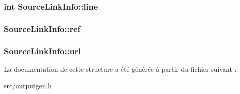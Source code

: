 \subsubsection[{line}]{\setlength{\rightskip}{0pt plus 5cm}int Source\+Link\+Info\+::line}\label{struct_source_link_info_abff71a239d4a657ea1543c0426b5726c}
\hypertarget{struct_source_link_info_a53631fa171fa05192c059087d66278c0}{}
\subsubsection[{ref}]{ Source\+Link\+Info\+::ref}\label{struct_source_link_info_a53631fa171fa05192c059087d66278c0}
\hypertarget{struct_source_link_info_af1fd0f6d7c9418bf922d33d591d7f196}{}
\subsubsection[{url}]{ Source\+Link\+Info\+::url}\label{struct_source_link_info_af1fd0f6d7c9418bf922d33d591d7f196}


La documentation de cette structure a été générée à partir du fichier suivant \+:\begin{DoxyCompactItemize}
\item 
src/\hyperlink{outputgen_8h}{outputgen.\+h}\end{DoxyCompactItemize}
